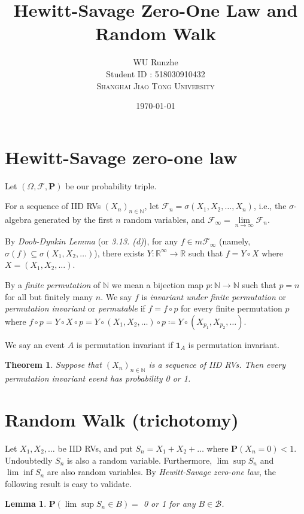 \documentclass[12pt]{article}
\title{Hewitt-Savage Zero-One Law and Random Walk}
\author{WU Runzhe\\
	Student ID : 518030910432\\
	\textsc{Shanghai Jiao Tong University}}
\date{\today}
\newcommand\bN{\mathbb{N}}
\newcommand\bR{\mathbb{R}}
\newcommand\cF{\mathcal{F}}
\newcommand\pro{\mathbf{P}}
\newcommand\ce{\coloneqq}
\newcommand{\ind}[1]{\mathbf{1}_{#1}}
\newtheorem{lemma}{Lemma}
\newtheorem{theorem}{Theorem}
\begin{document}
	\maketitle
	
	\section{Hewitt-Savage zero-one law}
	
	Let $(\Omega, \cF, \pro)$ be our probability triple.
	
	For a sequence of IID RVs $(X_n)_{n\in\bN}$, let $\cF_n=\sigma(X_1,X_2,\dots,X_n)$, i.e., the $\sigma$-algebra generated by the first $n$ random variables, and $\cF_\infty=\lim\limits_{n\rightarrow\infty}\cF_n$.
	
	By \textit{Doob-Dynkin Lemma} (or \textit{3.13. (d)}), for any $f\in m\cF_\infty$ (namely, $\sigma(f)\subseteq\sigma(X_1,X_2,\dots)$), there exists $Y:\bR^\infty\rightarrow \bR$ such that $f=Y\circ X$ where $X=(X_1,X_2,\dots)$.
	
	By a \textit{finite permutation} of $\bN$ we mean a bijection map $p:\bN\rightarrow\bN$ such that $p=n$ for all but finitely many $n$. We say $f$ is \textit{invariant under finite permutation} or \textit{permutation invariant} or \textit{permutable} if $f=f\circ p$ for every finite permutation $p$ where $f\circ p=Y\circ X\circ p=Y\circ (X_1,X_2,\dots)\circ p\ce Y\circ (X_{p_1},X_{p_2},\dots)$.
	
	We say an event $A$ is permutation invariant if $\ind{A}$ is permutation invariant.
	
	\begin{theorem}
		Suppose that $(X_n)_{n\in\bN}$ is a sequence of IID RVs. Then every permutation invariant event has probability 0 or 1.
	\end{theorem}
	
	\section{Random Walk (trichotomy)}
	
	Let $X_1,X_2,\dots$ be IID RVs, and put $S_n = X_1 + X_2 + \dots$ where $\pro(X_n=0)<1$. Undoubtedly $S_n$ is also a random variable. Furthermore, $\lim \sup S_n$ and $\lim \inf S_n$ are also random variables. By \textit{Hewitt-Savage zero-one law}, the following result is easy to validate.
	
	\begin{lemma}\label{l1}
		$\pro(\lim\sup S_n\in B)=$ 0 or 1 for any $B\in\mathcal{B}$.
	\end{lemma}
	
\end{document}
